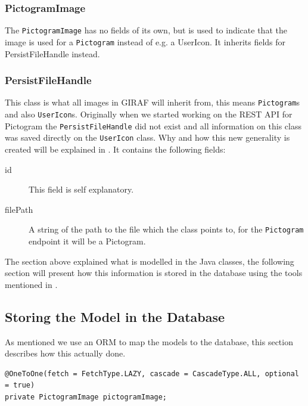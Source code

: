 \subsubsection*{PictogramImage}
The \texttt{PictogramImage} has no fields of its own, but is used to indicate that the image is used for a \texttt{Pictogram} instead of e.g. a UserIcon.
It inherits fields for PersistFileHandle instead.

\subsubsection*{PersistFileHandle}
This class is what all images in GIRAF will inherit from, this means \texttt{Pictogram}s and also \texttt{UserIcon}s. 
Originally when we started working on the REST API for Pictogram the \texttt{PersistFileHandle} did not exist and all information on this class was saved directly on the \texttt{UserIcon} class.
Why and how this new generality is created will be explained in .
It contains the following fields:
\begin{description}
	\item[id] This field is self explanatory.
	\item[filePath] A string of the path to the file which the class points to, for the \texttt{Pictogram} endpoint it will be a Pictogram.
\end{description}

The section above explained what is modelled in the Java classes, the following section will present how this information is stored in the database using the tools mentioned in .

\subsection{Storing the Model in the Database}

As mentioned we use an ORM to map the models to the database, this section describes how this actually done.

\begin{lstlisting}[float, floatplacement=h, caption={Fields with annotations which causes Hibernate to perform the ORM for a \texttt{PictogramImage}.},label={lst:PictoImage}]
@OneToOne(fetch = FetchType.LAZY, cascade = CascadeType.ALL, optional = true)
private PictogramImage pictogramImage;
\end{lstlisting}

